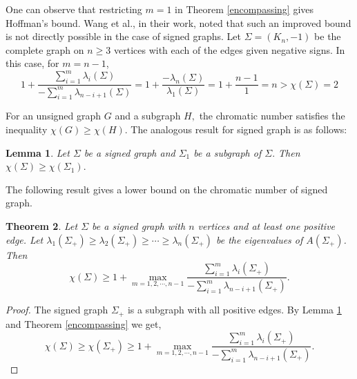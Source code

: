 \documentclass[12pt]{article}
\theoremstyle{plain}
\newtheorem{theorem}{Theorem}[section]
\newtheorem{lemma}[theorem]{Lemma}
\numberwithin{equation}{section}
\begin{document}
	One can observe that restricting $m=1$ in Theorem \ref{encompassing} gives Hoffman's bound. Wang et al., in their work, noted that such an improved bound is not directly possible in the case of signed graphs. Let $\Sigma=(K_n,-1)$ be the complete graph on $n \geq 3$ vertices with each of the edges given negative signs. In this case, for $m=n-1$, 
	$$1+   \frac{\sum_{i=1}^{m}\lambda_{i}(\Sigma)}{-\sum_{i=1}^{m}\lambda_{n-i+1}(\Sigma)} = 1+\frac{-\lambda_{n}(\Sigma)}{\lambda_{1}(\Sigma)}=1+\dfrac{n-1}{1}=n > \chi(\Sigma) = 2$$
	
	
	
	
	For an unsigned graph $G$ and a subgraph $H,$ the chromatic number satisfies the inequality $\chi(G)\geq \chi (H).$ The analogous result for signed graph is as follows:
	\begin{lemma}\label{Chromatic_lemmma}
		Let $\Sigma$ be a signed graph and $\Sigma_{1}$ be a subgraph of $\Sigma.$ Then $\chi(\Sigma)\geq \chi(\Sigma_{1}).$
	\end{lemma}
	The following result gives a lower bound on the chromatic number of signed graph.
	
	\begin{theorem}\label{Sigma+_Bound}
		Let $\Sigma$ be a signed graph with $n$ vertices and at least one positive edge. Let $\lambda_{1}(\Sigma_+)\geq\lambda_{2}(\Sigma_+)\geq \cdots \geq \lambda_{n}(\Sigma_+) $ be the eigenvalues of $A(\Sigma_+)$. Then \begin{equation}
			\chi(\Sigma)\geq 1+ \max_{m=1, 2, \cdots, n-1} \frac{\sum_{i=1}^{m}\lambda_{i}(\Sigma_+)}{-\sum_{i=1}^{m}\lambda_{n-i+1}(\Sigma_+)}.
		\end{equation} 
	\end{theorem}
	\begin{proof}
		The signed graph $\Sigma_{+}$ is a subgraph with all positive edges. By Lemma \ref{Chromatic_lemmma} and Theorem \ref{encompassing} we get,\\
		\begin{equation*}
			\chi(\Sigma) \geq \chi(\Sigma_+)\geq 1+ \max_{m=1, 2, \cdots, n-1} \frac{\sum_{i=1}^{m}\lambda_{i}(\Sigma_+)}{-\sum_{i=1}^{m}\lambda_{n-i+1}(\Sigma_+)}.
		\end{equation*}
	\end{proof}
	
\end{document}
